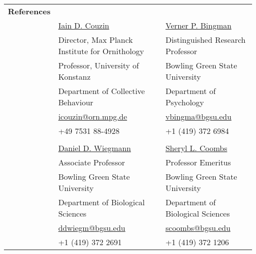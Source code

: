 \documentclass[letterpaper,10pt,oneside]{article}
\begin{document}
\newpage


\noindent \begin{longtable}{@{} l l l}
 \Large{\textbf{References}} \vspace{5mm} \\
 & \href{http://www.collectivebehaviour.com/couzin}{Iain D. Couzin} & \href{https://www.bgsu.edu/arts-and-sciences/biological-sciences/faculty-and-staff/alphabetical-listing/verner-bingman.html}{Verner P. Bingman} \\
 & Director, Max Planck Institute for Ornithology &  Distinguished Research Professor  \\
 & Professor, University of Konstanz &  Bowling Green State University \\
 & Department of Collective Behaviour  & Department of Psychology \\
 & \small{\href{mailto:icouzin@orn.mpg.de}{icouzin@orn.mpg.de}} & \small{\href{mailto:vbingma@bgsu.edu}{vbingma@bgsu.edu}} \\
 &\small{+49 7531 88-4928} & \small{+1 (419) 372 6984} \\
&& \\
  & \href{https://www.bgsu.edu/arts-and-sciences/biological-sciences/faculty-and-staff/alphabetical-listing/daniel-wiegmann.html}{Daniel D. Wiegmann} & \href{https://www.bgsu.edu/arts-and-sciences/neuroscience/nmb-people/faculty/sheryl-coombs.html}{Sheryl L. Coombs} \\
 & Associate Professor  &  Professor Emeritus \\
 & Bowling Green State University & Bowling Green State University \\
 & Department of Biological Sciences  & Department of Biological Sciences \\
 & \small{\href{mailto:ddwiegm@bgsu.edu}{ddwiegm@bgsu.edu}} & \small{\href{mailto:scoombs@bgsu.edu}{scoombs@bgsu.edu}} \\
 &\small{+1 (419) 372 2691} & \small{+1 (419) 372 1206} \\
 
\end{longtable}


\end{document}
